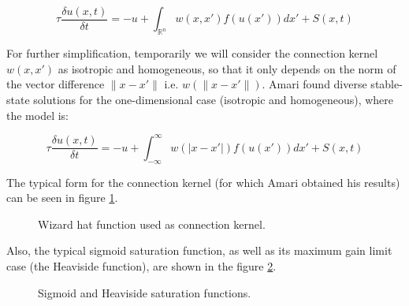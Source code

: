 \begin{equation}
  \label{eq:nf-simp}
  \tau \frac{\delta u(x,t)}{\delta
    t}=-u+\int_{\mathbb{R}^{n}}{w(x,x')f\left(
    u(x')\right) dx'}+S(x,t)
\end{equation}

For further simplification, temporarily we will consider the
connection kernel $w(x,x')$ as isotropic and homogeneous, so that it
only depends on the norm of the vector difference $\lVert x-x'\rVert$
i.e. $w\left( \lVert x-x'\rVert \right)$. Amari found diverse
stable-state solutions for the one-dimensional case (isotropic and
homogeneous), where the model is:

\begin{equation}
  \label{eq:nf-oned}
  \tau \frac{\delta u(x,t)} {\delta
    t}=-u+\int_{-\infty}^{\infty} {w\left( \lvert x-x'\rvert \right)
    f\left( u(x') \right) dx'}+S(x,t)
\end{equation}

The typical form for the connection kernel (for which Amari obtained
his results) can be seen in figure \ref{fig:wiz-hat}.

\begin{figure}[h]
  \centering
  \caption{Wizard hat function used as connection kernel.}
  \label{fig:wiz-hat}
\end{figure}

Also, the typical sigmoid saturation function, as well as its maximum
gain limit case (the Heaviside function), are shown in the figure \ref{fig:sat-fun}.

\begin{figure}[h]
  \centering
  \caption{Sigmoid and Heaviside saturation functions.}
  \label{fig:sat-fun}
\end{figure}






